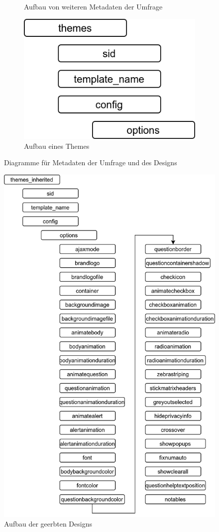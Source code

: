\begin{figure}[h]
{\begin{subfigure}[b]{.45\textwidth}
			\caption{Aufbau von weiteren Metadaten der Umfrage}
		\end{subfigure}%
		\begin{subfigure}[b]{.45\textwidth}
			\includegraphics[width=.8\textwidth]{./img/append_lss_theme.png}
			\caption{Aufbau eines Themes}
		\end{subfigure}%
		}
		\caption{Diagramme für Metadaten der Umfrage und des Designs}
\end{figure}

\begin{figure}[h]
	\centering
	\includegraphics[width=.95\textwidth]{./img/append_lss_theme_inh.png}
	\caption{Aufbau der geerbten Designs}
\end{figure}

